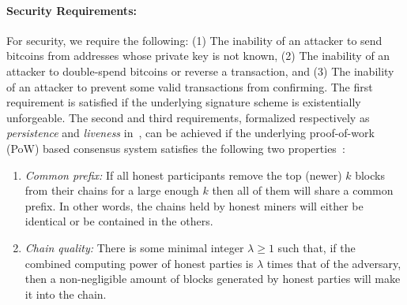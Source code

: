 \documentclass[]{report}   %
\begin{document}




\paragraph{Security Requirements:} For security, we require the following: (1) The inability of an attacker to send bitcoins from addresses whose private key is not known, (2) The inability of an attacker to double-spend bitcoins or reverse a transaction, and (3) The inability of an attacker to prevent some valid transactions from confirming. The first requirement is satisfied if the underlying signature scheme is existentially unforgeable. The second and third requirements, formalized respectively as {\em persistence} and {\em liveness} in~\cite{Garay2015}, can be achieved if the underlying proof-of-work (PoW) based consensus system satisfies the following two properties~\cite{Garay2015}:
\begin{enumerate}
	\item {\em Common prefix:} If all honest participants remove the top (newer) $k$ blocks from their chains for a large enough $k$ then all of them will share a common prefix. In other words, the chains held by honest miners will either be identical or be contained in the others.
	\item {\em Chain quality:} There is some minimal integer $\lambda\geq 1$ such that, if the combined computing power of honest parties is $\lambda$ times that of the adversary, then a non-negligible amount of blocks generated by honest parties will make it into the chain. 
\end{enumerate}
\end{document}
